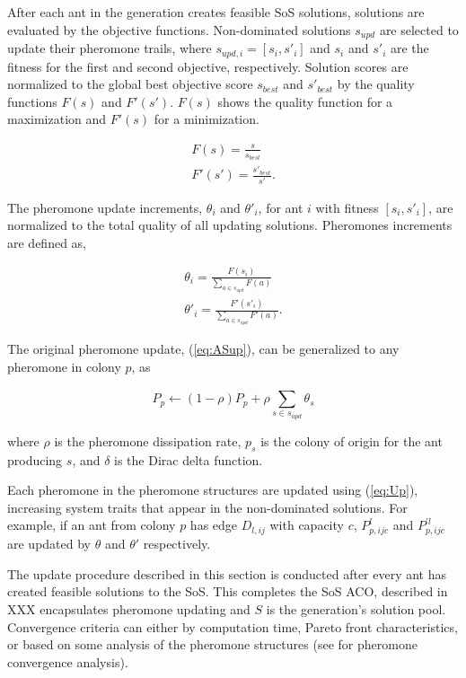 \documentclass[preprint,12pt]{elsarticle}
\begin{document}
After each ant in the generation creates feasible SoS solutions, solutions are evaluated by the objective functions. Non-dominated solutions $s_{upd}$ are selected to update their pheromone trails, where $s_{upd,i}=[s_i,s'_i]$ and $s_i$ and $s'_i$ are the fitness for the first and second objective, respectively. Solution scores are normalized to the global best objective score $s_{best}$ and $s'_{best}$ by the quality functions $F(s)$ and $F'(s')$. $F(s)$ shows the quality function for a maximization and $F'(s)$ for a minimization.

\begin{equation}
\begin{split}
F(s)=\frac{s}{s_{best}}\\
F'(s')=\frac{s'_{best}}{s'}.
\end{split}
\label{eq:Qual}
\end{equation}

The pheromone update increments, $\theta_i$ and $\theta'_i$, for ant $i$ with fitness $[s_i,s'_i]$, are normalized to the total quality of all updating solutions. Pheromones increments are defined as,

\begin{equation}
\begin{split}
\theta_i=\frac{F(s_i)}{\sum_{a\in s_{upd}}^{}F(a)}\\
\theta'_i=\frac{F'(s'_i)}{\sum_{a\in s_{upd}}^{}F'(a)}.
\end{split}
\label{eq:Inc}
\end{equation}

The original pheromone update, (\ref{eq:ASup}), can be generalized to any pheromone in colony $p$, as

\begin{equation}
P_p \leftarrow (1-\rho)P_p+\rho\sum_{s \in s_{upd}}^{}\theta_s
\label{eq:Up}
\end{equation} 

\noindent where $\rho$ is the pheromone dissipation rate, $p_s$ is the colony of origin for the ant producing $s$, and $\delta$ is the Dirac delta function. 

Each pheromone in the pheromone structures are updated using (\ref{eq:Up}), increasing system traits that appear in the non-dominated solutions. For example, if an ant from colony $p$ has edge $D_{l,ij}$ with capacity $c$, $P^l_{p,ijc}$ and $P^{'l}_{p,ijc}$ are updated by $\theta$ and $\theta'$ respectively. 

The update procedure described in this section is conducted after every ant has created feasible solutions to the SoS. This completes the SoS ACO, described in XXX encapsulates pheromone updating and $S$ is the generation's solution pool. Convergence criteria can either by computation time, Pareto front characteristics, or based on some analysis of the pheromone structures (see \cite{Stutzle2000} for pheromone convergence analysis). 
\end{document}
